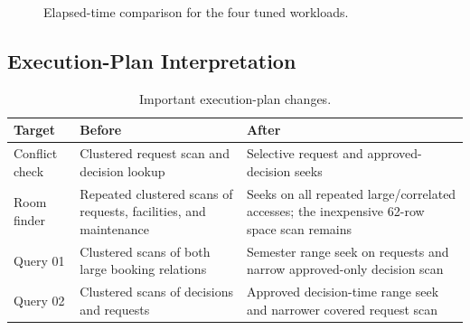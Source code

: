 \begin{figure}[H]
  \centering
  \caption{Elapsed-time comparison for the four tuned workloads.}
  \label{fig:index-chart}
\end{figure}

\subsection{Execution-Plan Interpretation}

\begin{table}[H]
  \centering
  \small
  \begin{tabularx}{\textwidth}{>{\raggedright\arraybackslash}p{3.0cm}XX}
    \toprule
    \textbf{Target} & \textbf{Before} & \textbf{After}\\
    \midrule
    Conflict check &
    Clustered request scan and decision lookup &
    Selective request and approved-decision seeks\\
    Room finder &
    Repeated clustered scans of requests, facilities, and maintenance &
    Seeks on all repeated large/correlated accesses; the inexpensive 62-row space scan remains\\
    Query 01 &
    Clustered scans of both large booking relations &
    Semester range seek on requests and narrow approved-only decision scan\\
    Query 02 &
    Clustered scans of decisions and requests &
    Approved decision-time range seek and narrower covered request scan\\
    \bottomrule
  \end{tabularx}
  \caption{Important execution-plan changes.}
\end{table}

